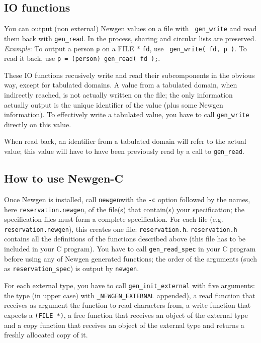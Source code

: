 \subsection{IO functions}

You can output (non external) Newgen values on a file with {\tt
gen\_write} and read them back with {\tt gen\_read}. In the process,
sharing and circular lists are preserved.
{\em Example}: To output a person {\tt p} on a FILE * {\tt fd}, use {\tt
gen\_write( fd, p )}. To read it back, use {\tt p = (person) gen\_read( fd
);}. 

These IO functions recusively write and read their subcomponents in the
obvious way, except for tabulated domains. A value from a tabulated
domain, when indirectly reached, is not actually written on the file;
the only information actually output is the unique identifier of the
value (plus some Newgen information). To effectively write a tabulated
value, you have to call {\tt gen\_write} directly on this value.

When read back, an identifier from a tabulated domain will refer to the
actual value; this value will have to have been previously read by a
call to {\tt gen\_read}.

\subsection{How to use Newgen-C}

Once Newgen is installed, call {\tt newgen}with the {\tt -c} option
followed by the names, here {\tt reservation.newgen}, of the file(s)
that contain(s) your specification; the specification files must form a
complete specification. For each file (e.g. {\tt reservation.newgen}),
this creates one file: {\tt reservation.h}. {\tt reservation.h} contains
all the definitions of the functions described above (this file has to
be included in your C program).  You have to call {\tt gen\_read\_spec}
in your C program before using any of Newgen generated functions; the
order of the arguments (such as {\tt reservation\_spec}) is output by
{\tt newgen}.

For each external type, you have to call {\tt gen\_init\_external} with
five arguments: the type (in upper case) with \verb|_NEWGEN_EXTERNAL|
appended), a read function that receives 
as argument the function to read characters from, a write function that
expects a {\tt (FILE *)}, a free function that receives an object of
the external type and a copy function that receives an object of the
external type and returns a freshly allocated copy of it.


